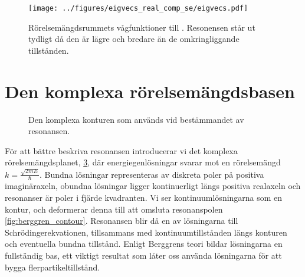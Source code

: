 \documentclass[12pt,a4paper]{article}
\begin{document}
\begin{figure}[ht]
  \centering
  	\texttt{[image: ../figures/eigvecs\_real\_comp\_se/eigvecs.pdf]}

  \caption{Rörelsemängdsrummets vågfunktioner till . Resonensen står ut tydligt då den är lägre och bredare än de omkringliggande tillstånden.} 
  \label{fig:resonance_wavfunction}
\end{figure}

\begin{figure}[h]
  \label{fig:resonance_wavefunction}
  \end{figure}
  
\section{Den komplexa rörelsemängdsbasen}

\begin{figure}[t]
  \centering
  \caption{Den komplexa konturen som används vid bestämmandet av resonansen.}
  \label{fig:simple_contour}
\end{figure}

För att bättre beskriva resonansen introducerar vi det komplexa rörelsemängdsplanet, \cref{fig:simple_contour}, där energiegenlösningar svarar mot en rörelsemängd $k = \frac{\sqrt{2mE}}{{\hbar}}$.
Bundna lösningar representeras av diskreta poler på positiva imaginäraxeln, obundna lösningar ligger kontinuerligt längs positiva realaxeln och resonanser är poler i fjärde kvadranten.
Vi ser kontinuumlösningarna som en kontur, och deformerar denna till att omsluta resonanspolen \cref{fig:berggren_contour}. 
Resonansen blir då en av lösningarna till Schrödingerekvationen, tillsammans med kontinuumtillstånden längs konturen och eventuella bundna tillstånd.
Enligt Berggrens teori \cite{berggren} bildar lösningarna en fullständig bas, ett viktigt resultat som låter oss använda lösningarna för att bygga flerpartikeltillstånd.
\end{document}
